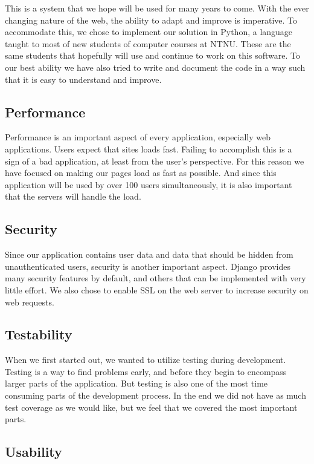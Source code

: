 This is a system that we hope will be used for many years to come. With
the ever changing nature of the web, the ability to adapt and improve
is imperative. To accommodate this, we chose to implement our solution
in Python, a language taught to most of new students of computer
courses at NTNU. These are the same students that hopefully will use
and continue to work on this software. To our best ability we have also
tried to write and document the code in a way such that it is easy to
understand and improve.

\subsection{Performance}

Performance is an important aspect of every application, especially web
applications. Users expect that sites loads fast. Failing to accomplish
this is a sign of a bad application, at least from the
user{\textquoteright}s perspective. For this reason we have focused on
making our pages load as fast as possible. And since this application
will be used by over 100 users simultaneously, it is also important
that the servers will handle the load. \ 

\subsection{Security}

Since our application contains user data and data that should be hidden
from unauthenticated users, security is another important aspect.
Django provides many security features by default, and others that can
be implemented with very little effort. We also chose to enable SSL on
the web server to increase security on web requests.

\subsection{Testability}

When we first started out, we wanted to utilize testing during
development. Testing is a way to find problems early, and before they
begin to encompass larger parts of the application. But testing is also
one of the most time consuming parts of the development process. In the
end we did not have as much test coverage as we would like, but we feel
that we covered the most important parts.

\subsection{Usability}

